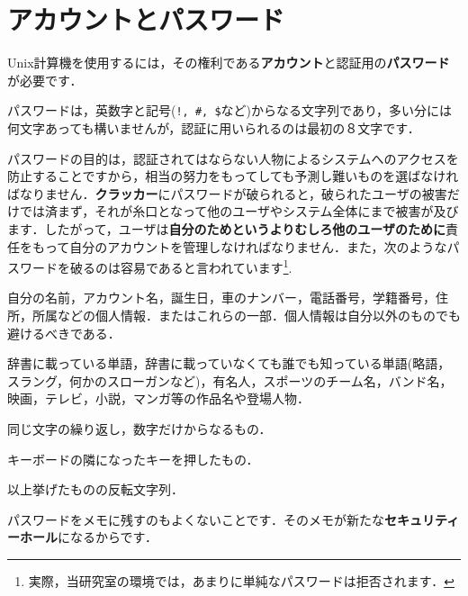 \documentclass[main]{subfiles}
\begin{document}
\chapter{アカウントとパスワード}

Unix計算機を使用するには，その権利である\textbf{アカウント}と認証用の\textbf{パスワード}が必要です．


パスワードは，英数字と記号(\texttt{!, \#, \$}など)からなる文字列であり，多い分には何文字あっても構いませんが，認証に用いられるのは最初の８文字です．


パスワードの目的は，認証されてはならない人物によるシステムへのアクセスを防止することですから，相当の努力をもってしても予測し難いものを選ばなければなりません．\textbf{クラッカー}にパスワードが破られると，破られたユーザの被害だけでは済まず，それが糸口となって他のユーザやシステム全体にまで被害が及びます．したがって，ユーザは\textbf{自分のためというよりむしろ他のユーザのために}責任をもって自分のアカウントを管理しなければなりません．また，次のようなパスワードを破るのは容易であると言われています\footnote{実際，当研究室の環境では，あまりに単純なパスワードは拒否されます．}.


\begin{myitemize}

    \item 自分の名前，アカウント名，誕生日，車のナンバー，電話番号，学籍番号，住所，所属などの個人情報．またはこれらの一部．個人情報は自分以外のものでも避けるべきである．
     
    \item 辞書に載っている単語，辞書に載っていなくても誰でも知っている単語(略語，スラング，何かのスローガンなど)，有名人，スポーツのチーム名，バンド名，映画，テレビ，小説，マンガ等の作品名や登場人物．
    
    \item 同じ文字の繰り返し，数字だけからなるもの．

    \item キーボードの隣になったキーを押したもの．

    \item 以上挙げたものの反転文字列．
\end{myitemize}

\indent
パスワードをメモに残すのもよくないことです．そのメモが新たな\textbf{セキュリティーホール}になるからです．\\
\end{document}
